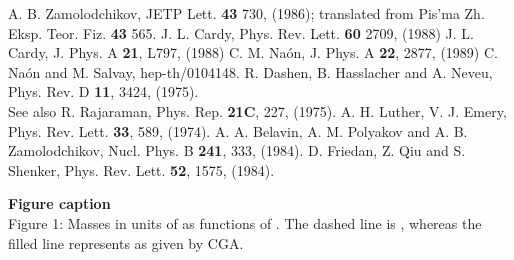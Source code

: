 \documentclass[a4paper,12pt]{article}
\begin{document}
\begin{thebibliography}{<99>}
 A. B. Zamolodchikov, JETP Lett. {\bf 43} 730, (1986); translated from
Pis'ma Zh. Eksp. Teor. Fiz. {\bf 43} 565.
 J. L. Cardy, Phys. Rev. Lett. {\bf 60} 2709,
(1988)
J. L.  Cardy, J. Phys. A {\bf 21}, L797, (1988)
 C. M. Na\'on, J. Phys. A {\bf 22}, 2877, (1989)
 C. Na\'on and M. Salvay, hep-th/0104148.
 R. Dashen, B. Hasslacher and A. Neveu, Phys. Rev. D {\bf 11}, 3424,
(1975).\\ See also R. Rajaraman, Phys. Rep. {\bf 21C}, 227, (1975).
 A. H. Luther, V. J. Emery, Phys. Rev. Lett. {\bf 33}, 589,
(1974).
 A. A. Belavin, A. M. Polyakov and A. B. Zamolodchikov, Nucl. Phys. B
{\bf 241}, 333, (1984).
 D. Friedan, Z. Qiu and S. Shenker, Phys. Rev. Lett. {\bf 52}, 1575,
(1984).

\end{thebibliography}
\newpage


{\bf Figure caption}\\

Figure 1: Masses in units of \myHighlight{$\sqrt{\alpha}$}\coordHE{} as functions of \coordHE{}. The dashed line is
\coordHE{}, whereas the filled line represents \myHighlight{$\Omega/\sqrt{\alpha}$}\coordHE{} as
given by CGA.\\
\end{document}
